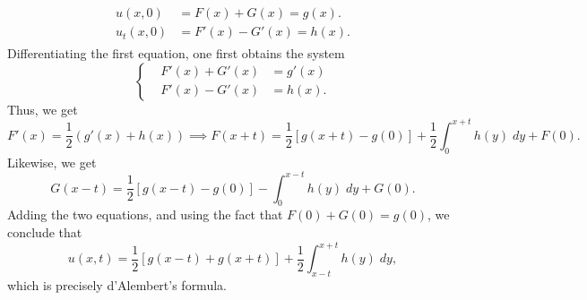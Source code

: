 \documentclass{article}
\begin{document}
\begin{enumerate}[itemsep =-2pt,label = (\alph{*})]
		\begin{align*}
			\begin{split}
				u(x, 0) &= F(x) + G(x) = g(x). \\
				u_{t}(x, 0) &= F'(x) - G'(x) = h(x). 
			\end{split}
		\end{align*}
		Differentiating the first equation, one first obtains the system 
		\begin{equation*}
			\left\{
			\begin{alignedat}{2}
				&F'(x) + G'(x) &= g'(x) \\
				&F'(x) - G'(x) &= h(x). 
			\end{alignedat}
			\right. 
		\end{equation*} 
		Thus, we get 
		\begin{equation*}
			F'(x) = \frac{1}{2}(g'(x) +h(x)) \implies F(x + t) = \frac{1}{2}[g(x+ t) - g(0)] + \frac{1}{2}\int_{0}^{x + t}h(y)\;dy + F(0). 
		\end{equation*}
		Likewise, we get 
		\begin{equation*}
			G(x-t) = \frac{1}{2}[g(x - t) - g(0)] -\int_{0}^{x - t}h(y)\;dy + G(0). 
		\end{equation*}
		Adding the two equations, and using the fact that $F(0) + G(0) = g(0)$, we conclude that 
		\begin{equation*}
			u(x,t) = \frac{1}{2}[g(x - t) + g(x + t)] + \frac{1}{2}\int_{x - t}^{x + t}h(y)\;dy, 
		\end{equation*}
		which is precisely d'Alembert's formula. 
	\end{enumerate}
	
\end{document}
